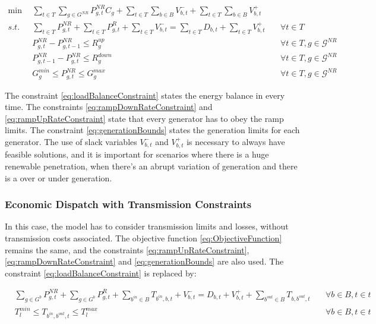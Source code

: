 \documentclass[12pt,LUDisStyle,twosided]{book}
\newcommand{\mc}{\mathcal}
\begin{document}
\begin{subequations}\label{model:simple_ED}
\begin{alignat}{4}
\min ~~& \sum_{t \in T}\sum_{g \in G^{NR}} P^{NR}_{g,t} C_{g} + \sum_{t \in T}\sum_{b \in B} V^{-}_{b,t} + \sum_{t \in T}\sum_{b \in B} V^{+}_{b,t} \label{eq:ObjectiveFunction} \\
s.t. ~~~& \sum_{t \in T} P^{NR}_{g,t} + \sum_{t \in T} P^{R}_{g,t} + \sum_{t \in T}V^{-}_{b,t} = \sum_{t \in T} D_{b,t}  + \sum_{t \in T}V^{+}_{b,t}  &~& \forall t \in T  \label{eq:loadBalanceConstraint} \\
& P^{NR}_{g,t} - P^{NR}_{g,t - 1} \leq R^{up}_{g} &~& \forall t \in T, g \in \mc{G}^{NR}\label{eq:rampUpRateConstraint} \\
& P^{NR}_{g,t -1 } - P^{NR}_{g,t} \leq R^{down}_{g} &~& \forall t \in T, g \in \mc{G}^{NR}\label{eq:rampDownRateConstraint} \\
& G^{min}_{g}\leq P^{NR}_{g,t} \leq G^{max}_{g} &~& \forall t \in T, g \in \mc{G}^{NR}\label{eq:generationBounds}
\end{alignat} 
\end{subequations}

The constraint \ref{eq:loadBalanceConstraint} states the energy balance in every time. The constraints \ref{eq:rampDownRateConstraint} and \ref{eq:rampUpRateConstraint} state that every generator has to obey the ramp limits. The constraint \ref{eq:generationBounds} states the generation limits for each generator. The use of slack variables $V^{-}_{b,t}$ and $V^{+}_{b,t}$ is necessary to always have feasible solutions, and it is important for scenarios where there is a huge renewable penetration, when there's an abrupt variation of generation and there is a over or under generation.   

\subsubsection{Economic Dispatch with Transmission Constraints}

In this case, the model has to consider transmission limits and losses, without transmission costs associated. The objective function \ref{eq:ObjectiveFunction} remains the same, and the constraints \ref{eq:rampUpRateConstraint}, \ref{eq:rampDownRateConstraint} and \ref{eq:generationBounds} are also used. The constraint \ref{eq:loadBalanceConstraint} is replaced by:  

\begin{subequations}\label{model:edTransmissionConstraints}
\begin{alignat}{4}
&\sum_{g \in G^{b}} P^{NR}_{g,t} + \sum_{g \in G^{b}} P^{R}_{g,t} + \sum_{b^{in} \in B} T_{b^{in},b,t} + V^{-}_{b,t} = D_{b,t}  + V^{+}_{b,t} + \sum_{b^{out} \in B} T_{b,b^{out},t}  &~& \forall b \in B, t \in t \label{eq:transmissionBalanceConstraint} \\
& T^{min}_{l} \leq T_{b^{in},b^{out},t} \leq T^{max}_{l}  &~& \forall b \in B, t \in t \label{eq:transmissionLimits}
\end{alignat} 
\end{subequations}
\end{document}
